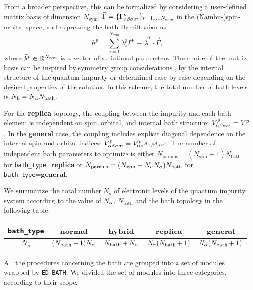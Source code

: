 \documentclass[edipack_sp.tex]{subfiles}
\begin{document}
From a broader perspective, this can be formalized by considering  
a user-defined matrix basis of dimension $N_\mathrm{sym}$, 
$\vec{\Gamma}=\{ \Gamma^\nu_{\alpha\beta\sigma\sigma'} \}_{\nu=1,\dots,N_\mathrm{sym}}$ in the (Nambu-)spin-orbital
space, and expressing the bath Hamiltonian as
$$
h^p = \sum_{\nu=1}^{N_\mathrm{sym}} \lambda^p_\nu
\Gamma^\nu\equiv \vec{\lambda}^p\cdot \vec{\Gamma},
\label{eq:replica_bath_sym}
$$
where $\vec{\lambda}^p\in\mathbb{R}^{N_\mathrm{sym}}$ is a vector of variational parameters. 
The choice of the matrix basis can be inspired by symmetry group considerations \cite{Koch2008PRB,Senechal2010PRB}, by the internal structure
of the quantum impurity or determined
case-by-case depending on the desired properties of the solution.
In this scheme, the total number of bath levels is  $N_\mathrm{b}
= N_\alpha N_\mathrm{bath}$. 


For the {\bf replica} topology, the coupling between the impurity 
and each bath element is independent on spin, orbital, and internal 
bath structure: $V^p_{\alpha\beta\sigma\sigma'} = V^p$.
In the {\bf general} case, the coupling includes explicit 
diagonal
dependence on the internal spin and orbital indices: $V^p_{\alpha\beta\sigma\sigma'}
= V^p_{\alpha\sigma}\delta_{\alpha\beta}\delta_{\sigma\sigma'}$. 
%
The number of independent bath parameters to optimize is either 
$N_\mathrm{params} = (N_\mathrm{sym}+1)N_\mathrm{bath}$ for {\tt bath\_type}={\bf replica} or 
$N_\mathrm{params} = (N_\mathrm{sym}+N_\alpha N_\sigma)N_\mathrm{bath}$ for {\tt bath\_type}={\bf general}.

We summarize the total number $N_s$ of electronic levels of the quantum impurity system according to the value of $N_\alpha$, $N_\mathrm{bath}$ and the bath topology in the following table:
\begin{center}
\begin{tabular}{ |c||c|c|c|c| } 
 \hline     
{\tt bath\_type} & {\bf normal} & {\bf hybrid} & {\bf replica} & {\bf general}\\
 \hline 
  \hline    
  $N_s$ & 
 $(N_\mathrm{bath}+1)N_\alpha$ & 
 $N_\mathrm{bath}+N_\alpha$ & 
 $N_\alpha(N_\mathrm{bath}+1)$ & 
 $N_\alpha(N_\mathrm{bath}+1)$  \\ 
 \hline
\end{tabular}
\end{center}

\vspace{2mm}
All the procedures concerning the bath
are grouped into a set of modules wrapped by {\tt ED\_BATH}. 
We divided the set of modules into three categories, according to their scope.
\end{document}
